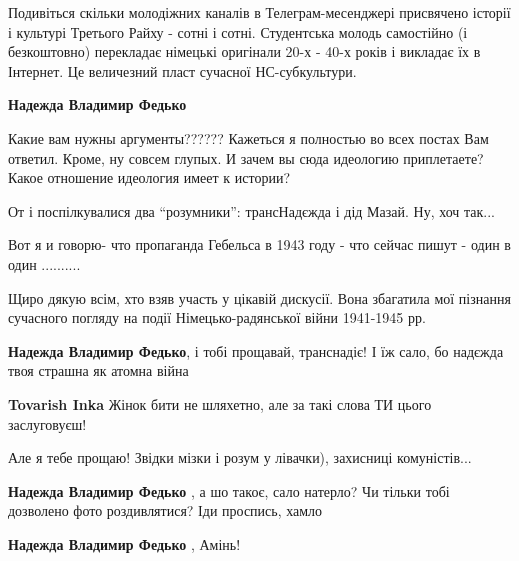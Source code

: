 \begin{itemize}
\begin{itemize}
\begin{itemize}
Подивіться скільки молодіжних каналів в Телеграм-месенджері присвячено історії
і культурі Третього Райху - сотні і сотні. Студентська молодь самостійно (і
безкоштовно) перекладає німецькі оригінали 20-х - 40-х років і викладає їх в
Інтернет. Це величезний пласт сучасної НС-субкультури.

\textbf{Надежда Владимир Федько} 

Какие вам нужны аргументы?????? Кажеться я полностью во всех постах Вам
ответил. Кроме, ну совсем глупых. И зачем вы сюда идеологию приплетаете? Какое
отношение идеология имеет к истории?

\end{itemize} %

От і поспілкувалися два \enquote{розумники}: трансНадєжда і дід Мазай. Ну, хоч так...

\end{itemize} %

Вот я и говорю- что пропаганда Гебельса в 1943 году - что сейчас пишут - один в один ..........


Щиро дякую всім, хто взяв участь у цікавій дискусії. Вона збагатила мої
пізнання сучасного погляду на події Німецько-радянської війни 1941-1945 рр.

\begin{itemize} %
\textbf{Надежда Владимир Федько}, і тобі прощавай, транснадіє! І їж сало, бо надєжда твоя страшна як атомна війна

\textbf{Tovarish Inka} Жінок бити не шляхетно, але за такі слова ТИ цього заслуговуєш!


Але я тебе прощаю! Звідки мізки і розум у лівачки), захисниці комуністів...

\textbf{Надежда Владимир Федько} , а шо такоє, сало натерло? Чи тільки тобі дозволено фото роздивлятися? Іди проспись, хамло

\textbf{Надежда Владимир Федько} , Амінь!
\end{itemize} %

\end{itemize} %

